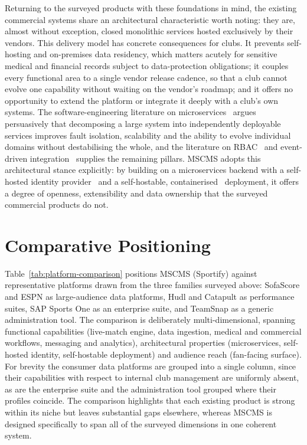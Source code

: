 Returning to the surveyed products with these foundations in mind, the existing commercial
systems share an architectural characteristic worth noting: they are, almost without
exception, closed monolithic services hosted exclusively by their vendors. This delivery model
has concrete consequences for clubs. It prevents self-hosting and on-premises data residency,
which matters acutely for sensitive medical and financial records subject to data-protection
obligations; it couples every functional area to a single vendor release cadence, so that a
club cannot evolve one capability without waiting on the vendor's roadmap; and it offers no
opportunity to extend the platform or integrate it deeply with a club's own systems. The
software-engineering literature on microservices~\cite{microservices} argues persuasively that
decomposing a large system into independently deployable services improves fault isolation,
scalability and the ability to evolve individual domains without destabilising the whole, and
the literature on RBAC~\cite{rbac} and event-driven integration~\cite{kafka} supplies the
remaining pillars. MSCMS adopts this architectural stance explicitly: by building on a
microservices backend with a self-hosted identity provider~\cite{keycloak} and a
self-hostable, containerised~\cite{docker} deployment, it offers a degree of openness,
extensibility and data ownership that the surveyed commercial products do not.

\section{Comparative Positioning}
\label{sec:lit-comparison}

Table~\ref{tab:platform-comparison} positions MSCMS (Sportify) against representative
platforms drawn from the three families surveyed above: SofaScore and ESPN as
large-audience data platforms, Hudl and Catapult as performance suites, SAP Sports One as
an enterprise suite, and TeamSnap as a generic administration tool. The comparison is
deliberately multi-dimensional, spanning functional capabilities (live-match engine, data
ingestion, medical and commercial workflows, messaging and analytics), architectural
properties (microservices, self-hosted identity, self-hostable deployment) and audience
reach (fan-facing surface). For brevity the consumer data platforms are grouped into a single
column, since their capabilities with respect to internal club management are uniformly
absent, as are the enterprise suite and the administration tool grouped where their profiles
coincide. The comparison highlights that each existing product is strong within its niche but
leaves substantial gaps elsewhere, whereas MSCMS is designed specifically to span all of the
surveyed dimensions in one coherent system.

